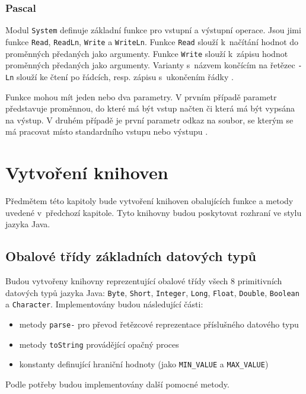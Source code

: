 \documentclass{bakalarka}
\begin{document}
\subsection{Pascal}
Modul \texttt{System} definuje základní funkce pro vstupní a výstupní operace. Jsou jimi funkce \texttt{Read}, \texttt{ReadLn}, \texttt{Write} a \texttt{WriteLn}. Funkce \texttt{Read} slouží k~načítání hodnot do proměnných předaných jako argumenty. Funkce \texttt{Write} slouží k~zápisu hodnot proměnných předaných jako argumenty. Varianty s~názvem končícím na řetězec \texttt{-Ln} slouží ke čtení po řádcích, resp. zápisu s~ukončením řádky \cite{pas-guide-system, pas-guide-read, pas-guide-write, pas-guide-readln, pas-guide-writeln}.\par
Funkce mohou mít jeden nebo dva parametry. V prvním případě parametr představuje proměnnou, do které má být vstup načten či která má být vypsána na výstup. V druhém případě je první parametr odkaz na soubor, se kterým se má pracovat místo standardního vstupu nebo výstupu \cite{pas-guide-read, pas-guide-write, pas-guide-readln, pas-guide-writeln}.

\chapter{Vytvoření knihoven}
Předmětem této kapitoly bude vytvoření knihoven obalujících funkce a metody uvedené v~předchozí kapitole. Tyto knihovny budou poskytovat rozhraní ve stylu jazyka Java. 

\section{Obalové třídy základních datových typů}
Budou vytvořeny knihovny reprezentující obalové třídy všech 8 primitivních datových typů jazyka Java: \texttt{Byte}, \texttt{Short}, \texttt{Integer}, \texttt{Long}, \texttt{Float}, \texttt{Double}, \texttt{Boolean} a \texttt{Character}. Implementovány budou následující části:
\begin{itemize}
\item metody \texttt{parse-} pro převod řetězcové reprezentace příslušného datového typu
\item metody \texttt{toString} provádějící opačný proces
\item konstanty definující hraniční hodnoty (jako \texttt{MIN\_VALUE} a \texttt{MAX\_VALUE})
\end{itemize}
Podle potřeby budou implementovány další pomocné metody.
\end{document}
